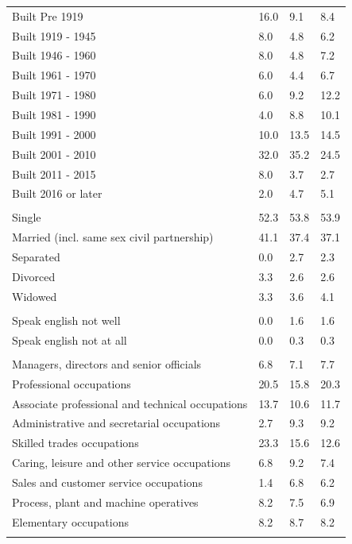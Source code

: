 \documentclass{article}
\begin{document}
\begin{table}[h]
\begin{tabular}{KTTT}
    \hline
Built Pre 1919 & 16.0&  9.1&  8.4\\
Built 1919 - 1945 & 8.0& 4.8& 6.2\\
Built  1946 - 1960 & 8.0& 4.8& 7.2\\
Built  1961 - 1970 & 6.0& 4.4& 6.7\\
Built  1971 - 1980 &  6.0&  9.2& 12.2\\
Built  1981 - 1990 &  4.0&  8.8& 10.1\\
Built  1991 - 2000 & 10.0& 13.5& 14.5\\
Built  2001 - 2010 & 32.0& 35.2& 24.5\\
Built  2011 - 2015 & 8.0& 3.7& 2.7\\
Built  2016 or later & 2.0& 4.7& 5.1\\
\hline
    \\
    \hline
Single & 52.3& 53.8& 53.9\\
Married (incl. same sex civil partnership) & 41.1& 37.4& 37.1\\
Separated  & 0.0& 2.7& 2.3\\
Divorced  & 3.3& 2.6& 2.6\\
Widowed & 3.3& 3.6& 4.1\\
\hline
    \\ 
    \hline
Speak english not well & 0.0& 1.6& 1.6\\
Speak english not at all & 0.0& 0.3& 0.3\\
\hline
    \\
    \hline
Managers, directors and senior officials & 6.8& 7.1& 7.7\\
Professional occupations & 20.5& 15.8& 20.3\\
Associate professional and technical occupations & 13.7& 10.6& 11.7\\
Administrative and secretarial occupations & 2.7& 9.3& 9.2\\
Skilled trades occupations & 23.3& 15.6& 12.6\\
Caring, leisure and other service occupations & 6.8& 9.2& 7.4\\
Sales and customer service occupations & 1.4& 6.8& 6.2\\
Process, plant and machine operatives & 8.2& 7.5& 6.9\\
Elementary occupations & 8.2& 8.7& 8.2\\
\hline
\end{tabular}
\end{table}
\end{document}
